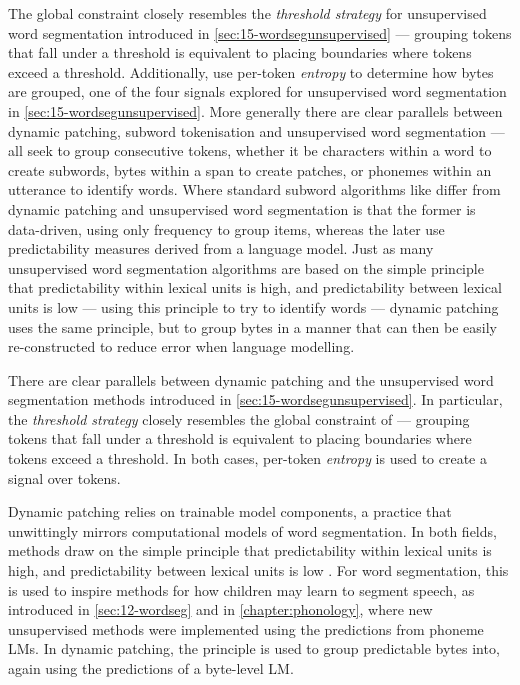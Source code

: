 The global constraint closely resembles the \emph{threshold strategy} for unsupervised word segmentation introduced in \cref{sec:15-wordsegunsupervised} --- grouping tokens that fall under a threshold is equivalent to placing boundaries where tokens exceed a threshold. Additionally, \citet{pagnoni2024byte} use per-token \emph{entropy} to determine how bytes are grouped, one of the four signals explored for unsupervised word segmentation in \cref{sec:15-wordsegunsupervised}. More generally there are clear parallels between dynamic patching, subword tokenisation and unsupervised word segmentation --- all seek to group consecutive tokens, whether it be characters within a word to create subwords, bytes within a span to create patches, or phonemes within an utterance to identify words. Where standard subword algorithms like \bpe differ from dynamic patching and unsupervised word segmentation is that the former is data-driven, using only frequency to group items, whereas the later use predictability measures derived from a language model. Just as many unsupervised word segmentation algorithms are based on the simple principle that predictability within lexical units is high, and predictability between lexical units is low \citep{harris1955} --- using this principle to try to identify words --- dynamic patching uses the same principle, but to group bytes in a manner that can then be easily re-constructed to reduce error when language modelling. 

There are clear parallels between dynamic patching and the unsupervised word segmentation methods introduced in \cref{sec:15-wordsegunsupervised}. In particular, the \emph{threshold strategy} closely resembles the global constraint of \citet{pagnoni2024byte} --- grouping tokens that fall under a threshold is equivalent to placing boundaries where tokens exceed a threshold. In both cases, per-token \emph{entropy} is used to create a signal over tokens.

Dynamic patching relies on trainable model components, a practice that unwittingly mirrors computational models of word segmentation. In both fields, methods draw on the simple principle that predictability within lexical units is high, and predictability between lexical units is low \citep{harris1955}. For word segmentation, this is used to inspire methods for how children may learn to segment speech, as introduced in \cref{sec:12-wordseg} and in \cref{chapter:phonology}, where new unsupervised methods were implemented using the predictions from phoneme LMs. In dynamic patching, the principle is used to group predictable bytes into, again using the predictions of a byte-level LM. 

